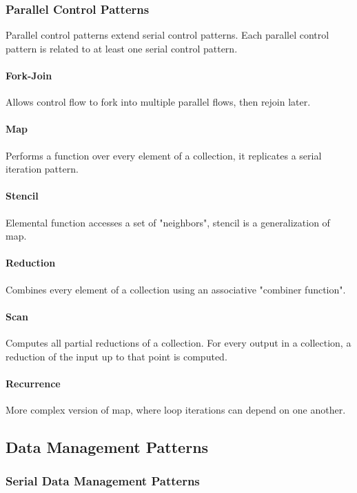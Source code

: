\subsubsection{Parallel Control Patterns}
Parallel control patterns extend serial control patterns.
Each parallel control pattern is related to at least one serial control pattern.

\paragraph{Fork-Join}
Allows control flow to fork into multiple parallel flows, then rejoin later.

\paragraph{Map}
Performs a function over every element of a collection, it replicates a serial iteration pattern.

\paragraph{Stencil}
Elemental function accesses a set of "neighbors", stencil is a generalization of map.

\paragraph{Reduction}
Combines every element of a collection using an associative "combiner function".

\paragraph{Scan}
Computes all partial reductions of a collection.
For every output in a collection, a reduction of the input up to that point is computed.

\paragraph{Recurrence}
More complex version of map, where loop iterations can depend on one another.

\subsection{Data Management Patterns}

\subsubsection{Serial Data Management Patterns}

